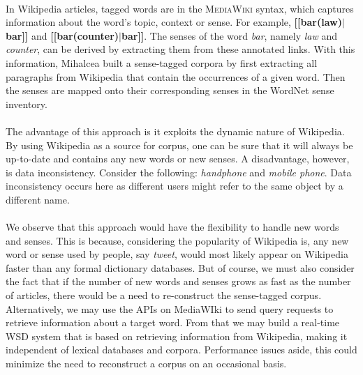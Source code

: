 \paragraph{}
In Wikipedia articles, tagged words are in the \textsc{MediaWiki} syntax, which captures information about the word's topic, context or sense. For example, \textbf{[[bar(law)$\mid$bar]]} and \textbf{[[bar(counter)$\mid$bar]]}. The senses of the word \textit{bar}, namely \textit{law} and \textit{counter}, can be derived by extracting them from these annotated links. With this information, Mihalcea built a sense-tagged corpora by first extracting all paragraphs from Wikipedia that contain the occurrences of a given word. Then the senses are mapped onto their corresponding senses in the WordNet sense inventory.

\paragraph{}
The advantage of this approach is it exploits the dynamic nature of Wikipedia. By using Wikipedia as a source for corpus, one can be sure that it will always be up-to-date and contains any new words or new senses. A disadvantage, however, is data inconsistency. Consider the following: \textit{handphone} and \textit{mobile phone}.  Data inconsistency occurs here as different users might refer to the same object by a different name.

\paragraph{}
We observe that this approach would have the flexibility to handle new words and senses. This is because, considering the popularity of Wikipedia is, any new word or sense used by people, say \textit{tweet}, would most likely appear on Wikipedia faster than any formal dictionary databases. But of course, we must also consider the fact that if the number of new words and senses grows as fast as the number of articles, there would be a need to re-construct the sense-tagged corpus. Alternatively, we may use the APIs on MediaWIki to send query requests to retrieve information about a target word. From that we may build a real-time WSD system that is based on retrieving information from Wikipedia, making it independent of lexical databases and corpora. Performance issues aside, this could minimize the need to reconstruct a corpus on an occasional basis.

